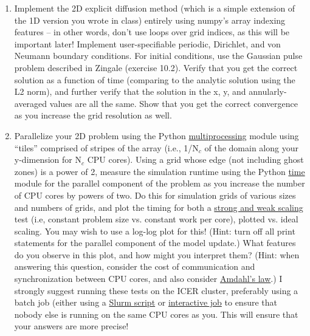 \documentclass[10pt]{article}
\begin{document}
\begin{enumerate}

  \item Implement the 2D explicit diffusion method (which is a simple
extension of the 1D version you wrote in class) entirely using numpy's
array indexing features -- in other words, don't use loops over grid
indices, as this will be important later!  Implement user-specifiable
periodic, Dirichlet, and von Neumann boundary conditions.  For initial
conditions, use the Gaussian pulse problem described in Zingale
(exercise 10.2).  Verify that you get the correct solution as a
function of time (comparing to the analytic solution using the L2
norm), and further verify that the solution in the x, y, and
annularly-averaged values are all the same.  Show that you get the
correct convergence as you increase the grid resolution as well.

\item Parallelize your 2D problem using the Python
\href{https://docs.python.org/3/library/multiprocessing.html}{multiprocessing}
module using ``tiles'' comprised of stripes of the array (i.e.,
1/N$_c$ of the domain along your y-dimension for N$_c$ CPU cores).
Using a grid whose edge (not including ghost zones) is a power of 2,
measure the simulation runtime using the Python
\href{https://docs.python.org/3/library/time.html}{time} module for
the parallel component of the problem as you increase the number of
CPU cores by powers of two.  Do this for simulation grids of various
sizes and numbers of grids, and plot the timing for both a
\href{https://hpc-wiki.info/hpc/Scaling}{strong and weak scaling} test 
(i.e, constant problem size vs. constant work per core), plotted
vs. ideal scaling.  You may wish to use a log-log plot for this!
(Hint: turn off all print statements for the parallel component of the
model update.)  What features do you observe in this plot, and how
might you interpret them?  (Hint: when answering this question,
consider the cost of communication and synchronization between CPU
cores, and also consider
\href{https://en.wikipedia.org/wiki/Amdahl%27s_law}{Amdahl's law}.)  I
strongly suggest running these tests on the ICER cluster, preferably
using a batch job (either using a \href{https://docs.icer.msu.edu/SLURM_overview/}{Slurm script} or
\href{https://docs.icer.msu.edu/Interactive_Job/}{interactive job} to ensure that nobody else is running on the same
CPU cores as you.  This will ensure that your answers are more precise!


\end{enumerate}
\end{document}

